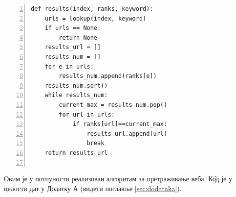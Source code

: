 		\begin{lstlisting}[caption=Функција која враћа најбољи резултат, label={lst:results}, numbers=left]
def results(index, ranks, keyword):
    urls = lookup(index, keyword)
    if urls == None:
        return None
    results_url = []    
    results_num = []
    for e in urls:
        results_num.append(ranks[e])
    results_num.sort()
    while results_num:
        current_max = results_num.pop()
        for url in urls:
            if ranks[url]==current_max:
                results_url.append(url)
                break
    return results_url
      
		\end{lstlisting}
		Овим је у потпуности реализован алгоритам за претраживање веба. К\^{о}д је у целости дат у Додатку А (видети поглавље \ref{sec:dodataka}).